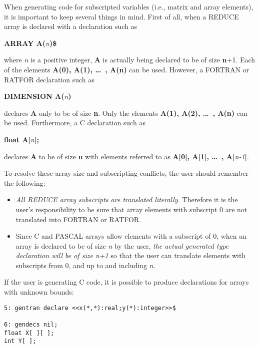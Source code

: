 When generating code for subscripted variables (i.e., matrix and
array elements), it is important to keep several things in mind.  First
of all, when a REDUCE array is declared with a declaration such as
\begin{center}
{\bf ARRAY A(}{\it n}{\bf )\$} 
\end{center}
where {\it n} is a positive integer, {\bf A} is actually being declared
to be of size {\bf n}+1.  Each of the elements {\bf A(0), A(1), \dots\  , A(n)}
can be used.  However, a FORTRAN or RATFOR declaration such as
\begin{center}
{\bf DIMENSION A(}{\it n}{\bf )}
\end{center}
declares {\bf A} only to be of size {\bf n}.  Only the elements
{\bf A(1), A(2), \dots\  , A(n)} can be used.  Furthermore, a C declaration
such as
\begin{center}
{\bf float A[}{\it n}{\bf ];}
\end{center}
declares {\bf A} to be of size {\bf n} with elements referred to as
{\bf A[0], A[1], \dots\  , A[}{\it n-1}{\bf ]}.

To resolve these array size and subscripting conflicts, the user should
remember the following:
\begin{itemize}
\item {\it All REDUCE array subscripts are translated literally.}
Therefore it is the user's responsibility to be sure that array elements with
subscript 0 are not translated into FORTRAN or RATFOR.
\item Since C and PASCAL
arrays allow elements with a subscript of 0, when an array is
declared to be of size {\it n} by the user, {\it the actual generated type
declaration will be of size n+1} so that the user can translate
elements with subscripts from 0, and up to and including {\it n}.
\end{itemize}

If the user is generating C code, it is possible to produce declarations 
for arrays with unknown bounds:
\begin{verbatim}
5: gentran declare <<x(*,*):real;y(*):integer>>$

6: gendecs nil;
float X[ ][ ];
int Y[ ];
\end{verbatim}


